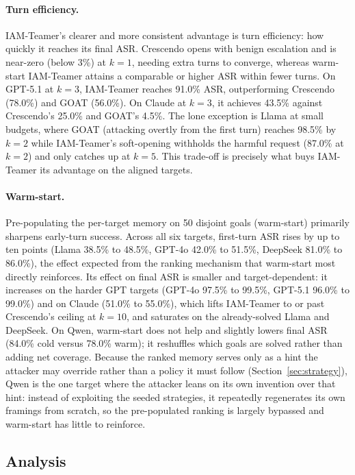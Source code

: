 \paragraph{Turn efficiency.}
IAM-Teamer's clearer and more consistent advantage is turn efficiency: how quickly it reaches its final ASR.
Crescendo opens with benign escalation and is near-zero (below 3\%) at $k=1$, needing extra turns to converge, whereas warm-start IAM-Teamer attains a comparable or higher ASR within fewer turns.
On GPT-5.1 at $k=3$, IAM-Teamer reaches 91.0\% ASR, outperforming Crescendo (78.0\%) and GOAT (56.0\%). On Claude at $k=3$, it achieves 43.5\% against Crescendo's 25.0\% and GOAT's 4.5\%.
The lone exception is Llama at small budgets, where GOAT (attacking overtly from the first turn) reaches 98.5\% by $k=2$ while IAM-Teamer's soft-opening withholds the harmful request (87.0\% at $k=2$) and only catches up at $k=5$.
This trade-off is precisely what buys IAM-Teamer its advantage on the aligned targets.

\paragraph{Warm-start.}
Pre-populating the per-target memory on 50 disjoint goals (warm-start) primarily sharpens early-turn success.
Across all six targets, first-turn ASR rises by up to ten points (Llama 38.5\% to 48.5\%, GPT-4o 42.0\% to 51.5\%, DeepSeek 81.0\% to 86.0\%), the effect expected from the ranking mechanism that warm-start most directly reinforces.
Its effect on final ASR is smaller and target-dependent: it increases on the harder GPT targets (GPT-4o 97.5\% to 99.5\%, GPT-5.1 96.0\% to 99.0\%) and on Claude (51.0\% to 55.0\%), which lifts IAM-Teamer to or past Crescendo's ceiling at $k=10$, and saturates on the already-solved Llama and DeepSeek.
On Qwen, warm-start does not help and slightly lowers final ASR (84.0\% cold versus 78.0\% warm); it reshuffles which goals are solved rather than adding net coverage.
Because the ranked memory serves only as a hint the attacker may override rather than a policy it must follow (Section~\ref{sec:strategy}), Qwen is the one target where the attacker leans on its own invention over that hint: instead of exploiting the seeded strategies, it repeatedly regenerates its own framings from scratch, so the pre-populated ranking is largely bypassed and warm-start has little to reinforce.

\FloatBarrier

\subsection{Analysis}
\label{sec:analysis}

